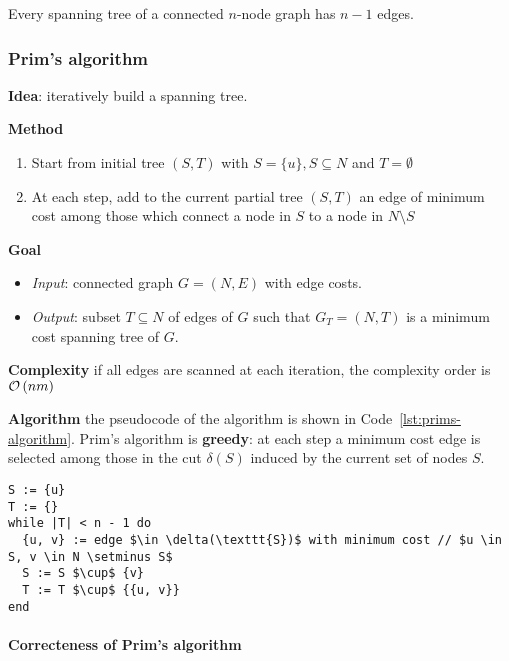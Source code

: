 \documentclass[english]{article}
\begin{document}
\begin{property}
  Every spanning tree of a connected \(n\)-node graph has \(n-1\) edges.
\end{property}

\subsubsection{Prim's algorithm}

\textbf{Idea}: iteratively build a spanning tree.

\bigskip
\textbf{Method}
\begin{enumerate}
  \item Start from initial tree \((S, T)\) with \(S = \{u\}, S \subseteq N\) and \(T = \emptyset\)
  \item At each step, add to the current partial tree \((S, T)\) an edge of minimum cost among those which connect a node in \(S\) to a node in \(N \setminus S\)
\end{enumerate}

\bigskip
\textbf{Goal}
\begin{itemize}[label=\(\rightarrow\)]
  \item \textit{Input}: connected graph \(G = (N, E)\) with edge costs.
  \item \textit{Output}: subset \(T \subseteq N\) of edges of \(G\) such that \(G_T = (N, T)\) is a minimum cost spanning tree of \(G\).
\end{itemize}

\bigskip
\textbf{Complexity}
if all edges are scanned at each iteration, the complexity order is \(\mathcal{O}\left(nm\right)\)

\bigskip
\textbf{Algorithm}
the pseudocode of the algorithm is shown in Code~\ref{lst:prims-algorithm}.
Prim's algorithm is \textbf{greedy}:
at each step a minimum cost edge is selected among those in the cut \(\delta(S)\) induced by the current set of nodes \(S\).

\begin{lstlisting}[style=custom, language=pseudocode, caption={Prim's algorithm}, label={lst:prims-algorithm}, float]
S := {u}
T := {}
while |T| < n - 1 do
  {u, v} := edge $\in \delta(\texttt{S})$ with minimum cost // $u \in S, v \in N \setminus S$
  S := S $\cup$ {v}
  T := T $\cup$ {{u, v}}
end
\end{lstlisting}

\paragraph{Correcteness of Prim's algorithm}
\end{document}

